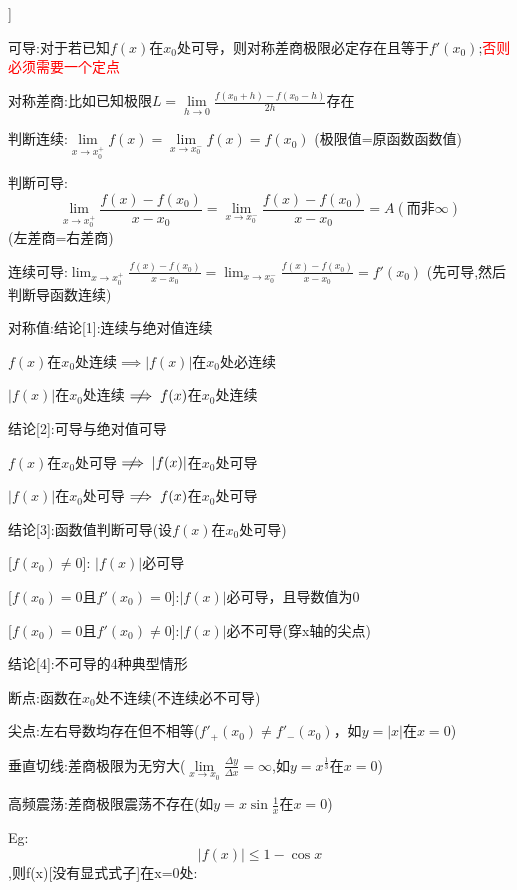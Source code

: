 \documentclass[11pt,a4paper,UTF8]{ctexart}
\begin{document}
\begin{thmbox}[题型二:差商与连续\&可导判定[注意分段讨论]]

可导:对于若已知$f(x)$在$x_0$处可导，则对称差商极限必定存在且等于$f'(x_0)$;\textcolor{red}{否则必须需要一个定点}

对称差商:比如已知极限$L = \lim\limits_{h \to 0} \frac{f(x_0 + h) - f(x_0 - h)}{2h}$存在

判断连续:$\lim\limits_{x \to x_0^+} f(x)=\lim\limits_{x \to x_0^-} f(x)= f(x_0)$				   (极限值=原函数函数值)

判断可导:
\begin{equation*}
\lim_{x \to x_0^+} \frac{f(x) - f(x_0)}{x - x_0}= \lim_{x \to x_0^-} \frac{f(x) - f(x_0)}{x - x_0}=A(\text{而非}\infty)
\end{equation*}
		 (左差商=右差商)

连续可导:$\lim_{x \to x_0^+} \frac{f(x) - f(x_0)}{x - x_0}= \lim_{x \to x_0^-} \frac{f(x) - f(x_0)}{x - x_0} = f'(x_0)$		    (先可导,然后判断导函数连续)

对称值:结论[1]:连续与绝对值连续

	  $f(x)$在$x_0$处连续$\implies |f(x)|$在$x_0$处必连续

	  $|f(x)|$在$x_0$处连续$\centernot\implies f(x)$在$x_0$处连续

      结论[2]:可导与绝对值可导

	  $f(x)$在$x_0$处可导$\centernot\implies |f(x)|$在$x_0$处可导

	  $|f(x)|$在$x_0$处可导$\centernot\implies f(x)$在$x_0$处可导

      结论[3]:函数值判断可导(设$f(x)$在$x_0$处可导)

	   [$f(x_0) \ne 0$]:        $|f(x)|$必可导

	   [$f(x_0) = 0$且$f'(x_0) = 0$]:$|f(x)|$必可导，且导数值为0

	   [$f(x_0) = 0$且$f'(x_0) \ne 0$]:$|f(x)|$必不可导(穿x轴的尖点)

      结论[4]:不可导的4种典型情形

	   断点:函数在$x_0$处不连续(不连续必不可导) 

	   尖点:左右导数均存在但不相等($f'_+(x_0) \ne f'_-(x_0)$，如$y = |x|$在$x=0$) 

	   垂直切线:差商极限为无穷大($\lim\limits_{x \to x_0} \frac{\Delta y}{\Delta x} = \infty$,如$y = x^{\frac{1}{3}}$在$x=0$)

	   高频震荡:差商极限震荡不存在(如$y = x \sin\frac{1}{x}$在$x=0$)

Eg:
\begin{equation*}
\vert{}f(x)\vert{} \le 1 - \cos x
\end{equation*}
,则f(x)[没有显式式子]在x=0处:


\end{thmbox}
\end{document}
